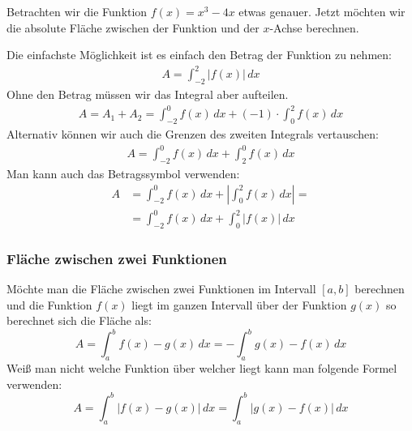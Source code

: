 \begin{bsp}
    Betrachten wir die Funktion $f(x)=x^3-4x$ etwas genauer. Jetzt möchten wir die absolute Fläche zwischen der Funktion und der $x$-Achse berechnen.
    \begin{center}
    \end{center}
    Die einfachste Möglichkeit ist es einfach den Betrag der Funktion zu nehmen:
    \begin{align*}
        A = \int_{-2}^2 \left| f(x) \right| \, dx
    \end{align*}
    Ohne den Betrag müssen wir das Integral aber aufteilen.
    \begin{align*}
        A = A_1 + A_2 = \int_{-2}^0 f(x)\,dx + (-1)\cdot\int_0^2 f(x)\,dx
    \end{align*}
    Alternativ können wir auch die Grenzen des zweiten Integrals vertauschen:
    \begin{align*}
        A = \int_{-2}^0 f(x)\,dx + \int_2^0 f(x)\,dx
    \end{align*}
    Man kann auch das Betragssymbol verwenden:
      \begin{align*}
        A &= \int_{-2}^0 f(x)\,dx + \left| \int_0^2 f(x)\,dx \right| = \\
          &= \int_{-2}^0 f(x)\,dx + \int_0^2 \left| f(x) \right| \,dx
    \end{align*}
\end{bsp}

\subsubsection{Fläche zwischen zwei Funktionen}
Möchte man die Fläche zwischen zwei Funktionen im Intervall $[a,b]$ berechnen und die Funktion $f(x)$ liegt im ganzen Intervall über der Funktion $g(x)$ so berechnet sich die Fläche als:
\begin{equation}
    A = \int_a^b f(x)-g(x) \, dx = - \int_a^b g(x) - f(x) \, dx
\end{equation}
Weiß man nicht welche Funktion über welcher liegt kann man folgende Formel verwenden:
\begin{equation}
    A = \int_a^b \left| f(x)-g(x) \right| \, dx = 
        \int_a^b \left| g(x)-f(x) \right| \, dx
\end{equation}

